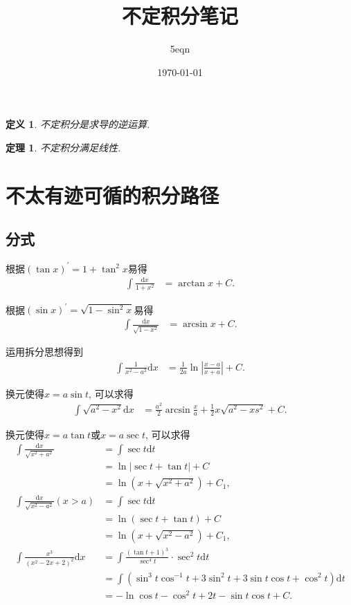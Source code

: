 \documentclass[UTF8,a4paper,11pt]{ctexart}
\title{不定积分笔记}
\author{5eqn}
\date{\today}
\newtheorem{definition}{定义}
\newtheorem{theorem}{定理}
\begin{document}
  \maketitle
  \begin{definition}
    不定积分是求导的逆运算.
  \end{definition}
  \begin{theorem}
    不定积分满足线性.
  \end{theorem}
  \section{不太有迹可循的积分路径}
    \subsection{分式}
      根据$\left(\tan x\right)^{\prime}=1+\tan ^{2}x$易得
      \[
      \begin{aligned}
        \int \frac{\mathrm{d}x}{1+x^{2}}&=\arctan x +C.
      \end{aligned}
      \]

      根据$\left(\sin x\right)^{\prime}=\sqrt{1-\sin ^{2}x}$易得
      \[
      \begin{aligned}
        \int \frac{\mathrm{d}x}{\sqrt{1-x^{2}}}&=\arcsin x+C.
      \end{aligned}
      \]

      运用拆分思想得到
      \[
      \begin{aligned}
        \int \frac{1}{x^{2}-a^{2}}\mathrm{d}x&=
        \frac{1}{2a}\ln \left| \frac{x-a}{x+a} \right|+C.
      \end{aligned}
      \]

      换元使得$x=a \sin t$, 可以求得
      \[
      \begin{aligned}
        \int \sqrt{a^{2}-x^{2}}\mathrm{d}x&=
        \frac{a^{2}}{2}\arcsin \frac{x}{a}+\frac{1}{2}x\sqrt{a^{2}-xs^{2}}+C.
      \end{aligned}
      \]
      
      换元使得$x=a \tan t$或$x = a \sec t$, 可以求得
      \[
      \begin{aligned}
        \int \frac{\mathrm{d}x}{\sqrt{x^{2}+a^{2}}}&=
        \int \sec t \mathrm{d}t
        \\&=\ln \left| \sec t + \tan t \right|+C
        \\&=\ln \left(x+\sqrt{x^{2}+a^{2}}\right)+C_1,\\
        \int \frac{\mathrm{d}x}{\sqrt{x^{2}-a^{2}}}\left(x>a\right)&=
        \int \sec t \mathrm{d}t
        \\&=\ln \left(\sec t+\tan t\right)+C
        \\&=\ln \left(x+\sqrt{x^{2}-a^{2}}\right)+C_1,\\
        \int \frac{x^{3}}{\left(x^{2}-2x+2\right)^{2}}\mathrm{d}x&=
        \int \frac{\left(\tan t+1\right)^{3}}{\sec ^{4}t}\cdot \sec ^{2}t \mathrm{d}t
        \\&=\int \left(\sin ^{3}t \cos ^{-1}t+3\sin ^{2}t+3\sin t \cos t+\cos ^{2}t\right)\mathrm{d}t
        \\&=-\ln \cos t-\cos ^{2}t+2t-\sin t \cos t+C.
      \end{aligned}
      \]
      
\end{document}

